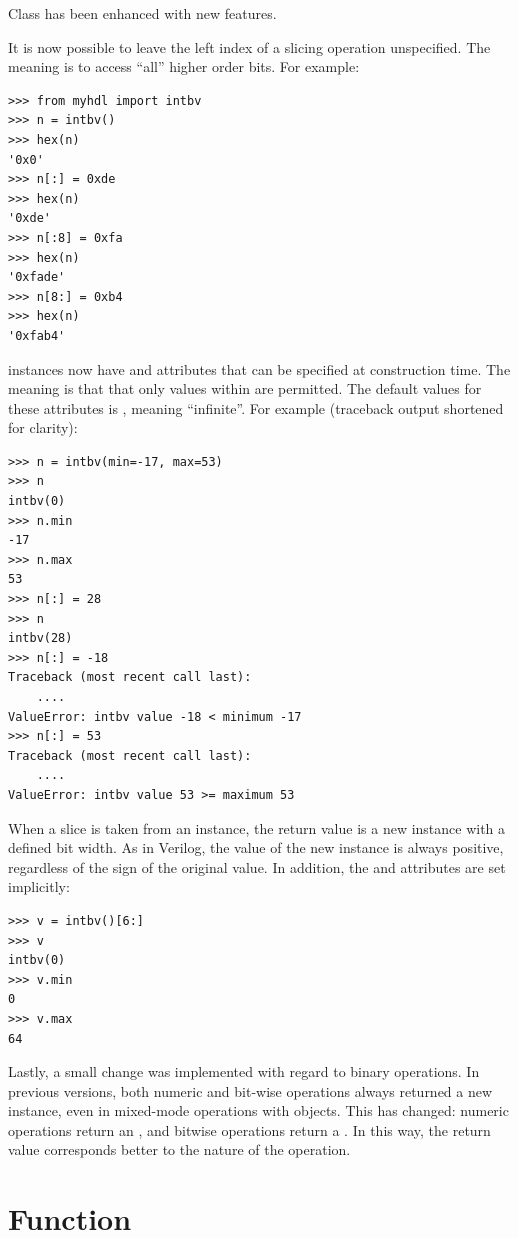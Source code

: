 \documentclass{howto}
\begin{document}
Class  has been enhanced with new features.

It is now possible to leave the left index of a slicing operation
unspecified. The meaning is to access ``all'' higher order bits. For
example:

\begin{verbatim}
>>> from myhdl import intbv
>>> n = intbv()
>>> hex(n)
'0x0'
>>> n[:] = 0xde
>>> hex(n)
'0xde'
>>> n[:8] = 0xfa
>>> hex(n)
'0xfade'
>>> n[8:] = 0xb4
>>> hex(n)
'0xfab4'
\end{verbatim}

 instances now have  and  attributes
that can be specified at construction time. The meaning is that that
only values within  are permitted. The default
values for these attributes is , meaning ``infinite''. For
example (traceback output shortened for clarity):

\begin{verbatim}
>>> n = intbv(min=-17, max=53)
>>> n
intbv(0)
>>> n.min
-17
>>> n.max
53
>>> n[:] = 28
>>> n
intbv(28)
>>> n[:] = -18
Traceback (most recent call last):
    ....
ValueError: intbv value -18 < minimum -17
>>> n[:] = 53
Traceback (most recent call last):
    ....
ValueError: intbv value 53 >= maximum 53
\end{verbatim}

When a slice is taken from an  instance, the return value
is a new  instance with a defined bit width. As in
Verilog, the value of the new  instance is always
positive, regardless of the sign of the original value. In addition,
the  and  attributes are set implicitly:

\begin{verbatim}
>>> v = intbv()[6:]
>>> v
intbv(0)
>>> v.min
0
>>> v.max
64
\end{verbatim}

Lastly, a small change was implemented with regard to 
binary operations. In previous versions, both numeric
and bit-wise operations always returned a new 
instance, even in mixed-mode operations with 
objects. This has changed: numeric operations 
return an , and bitwise operations return
a . In this way, the return value corresponds
better to the nature of the operation.

\section{Function  \label{section-concat}}
\end{document}
